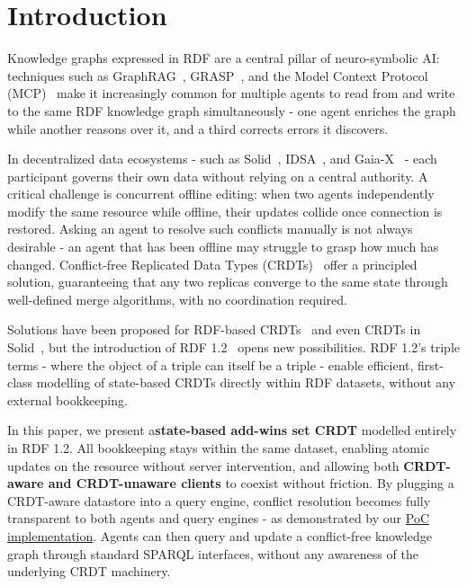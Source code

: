 \documentclass[runningheads]{llncs}
\begin{document}
    \section{Introduction}
    \label{introduction}

    Knowledge graphs expressed in RDF are a central pillar of neuro-symbolic AI:
    techniques such as GraphRAG~\cite{graphrag}, GRASP~\cite{grasp}, and the Model Context Protocol (MCP)~\cite{mcp}
    make it increasingly common for multiple agents to read from and write to the same RDF knowledge graph simultaneously -
    one agent enriches the graph while another reasons over it, and a third corrects errors it discovers.

    In decentralized data ecosystems - such as Solid~\cite{solid}, IDSA~\cite{idsa}, and Gaia-X~\cite{gaia-x} -
    each participant governs their own data without relying on a central authority.
    A critical challenge is concurrent offline editing:
    when two agents independently modify the same resource while offline, their updates collide once connection is restored.
    Asking an agent to resolve such conflicts manually is not always desirable - an agent that has been offline may struggle to grasp how much has changed.
    Conflict-free Replicated Data Types (CRDTs)~\cite{CRDTs} offer a principled solution,
    guaranteeing that any two replicas converge to the same state through well-defined merge algorithms, with no coordination required.

    Solutions have been proposed for RDF-based CRDTs~\cite{rdf-crdt} and even CRDTs in Solid~\cite{solid-crdt-yjs},
    but the introduction of RDF 1.2~\cite{rdf-1-2} opens new possibilities.
    RDF 1.2's triple terms - where the object of a triple can itself be a triple - enable efficient,
    first-class modelling of state-based CRDTs directly within RDF datasets, without any external bookkeeping.

    In this paper, we present a\textbf{state-based add-wins set CRDT} modelled entirely in RDF 1.2.
    All bookkeeping stays within the same dataset,
    enabling atomic updates on the resource without server intervention,
    and allowing both \textbf{CRDT-aware and CRDT-unaware clients} to coexist without friction.
    By plugging a CRDT-aware datastore into a query engine, conflict resolution becomes fully transparent to both agents and query engines -
    as demonstrated by our \href{https://www.npmjs.com/package/orset-rdf-store}{PoC implementation}.
    Agents can then query and update a conflict-free knowledge graph through standard SPARQL interfaces,
    without any awareness of the underlying CRDT machinery.
\end{document}

